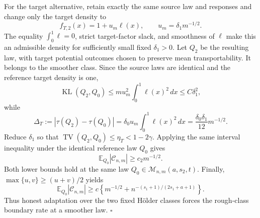 For the target alternative, retain exactly the same source law and responses and change only the target density to
\[
 f_{T,2}(x)=1+u_m\ell(x),
 \qquad u_m=\delta_1m^{-1/2}.
\]
The equality \(\int_0^1\ell=0\), strict target-factor slack, and smoothness of \(\ell\) make this an admissible density for sufficiently small fixed \(\delta_1>0\).  Let \(Q_2\) be the resulting law, with target potential outcomes chosen to preserve mean transportability.  It belongs to the smoother class.  Since the source laws are identical and the reference target density is one,
\[
 \operatorname{KL}(Q_2,Q_0)
 \le m u_m^2\int_0^1\ell(x)^2\,dx
 \le C\delta_1^2,
\]
while
\[
 \Delta_T:=|\tau(Q_2)-\tau(Q_0)|
 =\delta_0u_m\int_0^1\ell(x)^2\,dx
 =\frac{\delta_0\delta_1}{12}m^{-1/2}.
\]
Reduce \(\delta_1\) so that
\(\operatorname{TV}(Q_2,Q_0)\le\eta_T<1-2\gamma\).  Applying the same interval inequality under the identical reference law \(Q_0\) gives
\[
 \mathbb E_{Q_0}|\mathcal C_{n,m}|
 \ge c_2m^{-1/2}.
\]
Both lower bounds hold at the same law
\(Q_0\in\mathcal M_{n,m}(a,s_2,t)\).  Finally,
\(\max\{u,v\}\ge(u+v)/2\) yields
\[
 \mathbb E_{Q_0}|\mathcal C_{n,m}|
 \ge c\left\{m^{-1/2}
 +n^{-(s_1+1)/(2s_1+a+1)}\right\}.
\]
Thus honest adaptation over the two fixed H\"older classes forces the rough-class boundary rate at a smoother law. \(\square\)